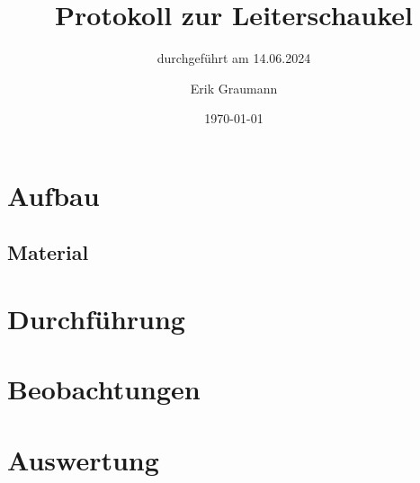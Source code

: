 \documentclass[
	fontsize=11pt,
	paper=a4,
	pagesize=auto,
	parskip=half,
	titlepage=on,
	ngerman
]{scrartcl}
\begin{document}
\title{Protokoll zur Leiterschaukel}
\subtitle{durchgeführt am 14.06.2024}
\author{Erik Graumann}
\date{\today}
\maketitle
\newpage

\tableofcontents
\newpage

\section{Aufbau}

\subsection{Material}

\newpage

\section{Durchführung}

\section{Beobachtungen}

\section{Auswertung}
\end{document}
